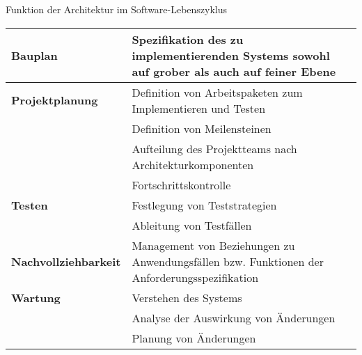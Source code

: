\begin{bonus}{Funktion der Architektur im Software-Lebenszyklus}
    \begin{tabularx}{\textwidth}{|>{\bfseries}l|X|}
        \hline
        Bauplan             & Spezifikation des zu implementierenden Systems sowohl auf grober als auch auf feiner Ebene   \\
        \hline
        Projektplanung      & Definition von Arbeitspaketen zum Implementieren und Testen                                  \\
                            & Definition von Meilensteinen                                                                 \\
                            & Aufteilung des Projektteams nach Architekturkomponenten                                      \\
                            & Fortschrittskontrolle                                                                        \\
        \hline
        Testen              & Festlegung von Teststrategien                                                                \\
                            & Ableitung von Testfällen                                                                     \\
        \hline
        Nachvollziehbarkeit & Management von Beziehungen zu Anwendungsfällen bzw. Funktionen der Anforderungsspezifikation \\
        \hline
        Wartung             & Verstehen des Systems                                                                        \\
                            & Analyse der Auswirkung von Änderungen                                                        \\
                            & Planung von Änderungen                                                                       \\
        \hline
    \end{tabularx}
\end{bonus}